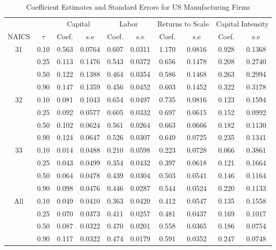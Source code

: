 \begin{table}[ht]
\centering
\caption{Coefficient Estimates and Standard Errors for US Manufacturing Firms} 
\begin{tabular}{cccccccccc}
  \hline\hline & & \multicolumn{2}{c}{Capital}  & \multicolumn{2}{c}{Labor} & \multicolumn{2}{c}{Returns to Scale} & \multicolumn{2}{c}{Capital Intensity}\\ \cmidrule(lr){3-4} \cmidrule(lr){5-6} \cmidrule(lr){7-8} \cmidrule(lr){9-10}NAICS & $\tau$ & Coef. & s.e & Coef. & s.e & Coef. & s.e & Coef. & s.e \\ 
  \hline
31 & 0.10 & 0.563 & 0.0764 & 0.607 & 0.0311 & 1.170 & 0.0816 & 0.928 & 0.1368 \\ 
   & 0.25 & 0.113 & 0.1476 & 0.543 & 0.0372 & 0.656 & 0.1478 & 0.208 & 0.2740 \\ 
   & 0.50 & 0.122 & 0.1388 & 0.464 & 0.0354 & 0.586 & 0.1468 & 0.263 & 0.2994 \\ 
   & 0.90 & 0.147 & 0.1359 & 0.456 & 0.0452 & 0.603 & 0.1452 & 0.322 & 0.3178 \\ 
  32 & 0.10 & 0.081 & 0.1043 & 0.654 & 0.0497 & 0.735 & 0.0816 & 0.123 & 0.1594 \\ 
   & 0.25 & 0.092 & 0.0577 & 0.605 & 0.0332 & 0.697 & 0.0615 & 0.152 & 0.0992 \\ 
   & 0.50 & 0.102 & 0.0624 & 0.561 & 0.0264 & 0.663 & 0.0666 & 0.182 & 0.1130 \\ 
   & 0.90 & 0.124 & 0.0647 & 0.526 & 0.0307 & 0.649 & 0.0725 & 0.235 & 0.1341 \\ 
  33 & 0.10 & 0.014 & 0.0488 & 0.210 & 0.0598 & 0.223 & 0.0728 & 0.066 & 0.3861 \\ 
   & 0.25 & 0.043 & 0.0499 & 0.354 & 0.0432 & 0.397 & 0.0618 & 0.121 & 0.1664 \\ 
   & 0.50 & 0.064 & 0.0478 & 0.439 & 0.0304 & 0.503 & 0.0541 & 0.146 & 0.1164 \\ 
   & 0.90 & 0.098 & 0.0476 & 0.446 & 0.0287 & 0.544 & 0.0524 & 0.220 & 0.1133 \\ 
  All & 0.10 & 0.049 & 0.0410 & 0.363 & 0.0420 & 0.412 & 0.0547 & 0.135 & 0.1558 \\ 
   & 0.25 & 0.070 & 0.0373 & 0.411 & 0.0257 & 0.481 & 0.0437 & 0.169 & 0.1017 \\ 
   & 0.50 & 0.087 & 0.0322 & 0.470 & 0.0201 & 0.558 & 0.0365 & 0.186 & 0.0754 \\ 
   & 0.90 & 0.117 & 0.0322 & 0.474 & 0.0179 & 0.591 & 0.0352 & 0.247 & 0.0748 \\ 
   \hline
\end{tabular}
\end{table}
